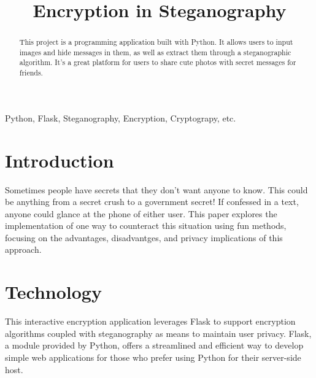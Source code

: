 \documentclass[conference]{IEEEtran}
\begin{document}
\title{Encryption in Steganography}

\author{
}


\maketitle

\begin{abstract}
This project is a programming application built with Python. It allows users to input images and hide messages in them, as well as extract them through a steganographic algorithm. It's a great platform for users to share cute photos with secret messages for friends.
\end{abstract}

\begin{IEEEkeywords}
Python, Flask, Steganography, Encryption, Cryptograpy, etc.
\end{IEEEkeywords}


\section{Introduction}
Sometimes people have secrets that they don’t want anyone to know. This could be anything from a secret crush to a government secret! If confessed in a text, anyone could glance at the phone of either user. This paper explores the implementation of one way to counteract this situation using fun methods, focusing on the advantages, disadvantges, and privacy implications of this approach.


\section{Technology}
This interactive encryption application leverages Flask to support encryption algorithms coupled with steganography as means to maintain user privacy. Flask, a module provided by Python, offers a streamlined and efficient way to develop simple web applications for those who prefer using Python for their server-side host.
\end{document}
